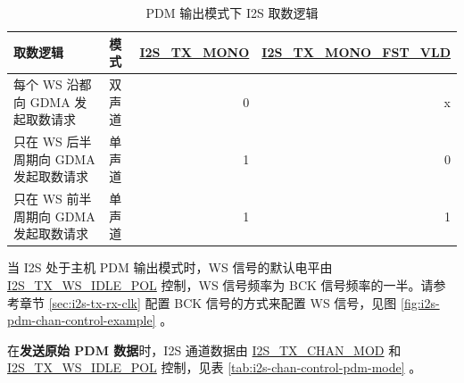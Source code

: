 \documentclass[main\_\_CN.tex]{subfiles}
\begin{document}
\begin{table}[H]
    \centering
    \caption{PDM 输出模式下 I2S 取数逻辑}
    \label{tab:i2s-data-fetch-control-pdm-mode}
    \begin{tabular}{|p{6.6cm}|l|r|r|}
    \hline
    \rowcolor{lightgray}
    \textbf{取数逻辑} &\textbf{模式} &\textbf{\hyperref[fielddesc:I2STXMONO]{I2S\_TX\_MONO}}  & \textbf{\hyperref[fielddesc:I2STXMONOFSTVLD]{I2S\_TX\_MONO\_FST\_VLD}} \\ \hline
                        每个 WS 沿都向 GDMA 发起取数请求 & 双声道 & 0 & x        \\ \hline
                        只在 WS 后半周期向 GDMA 发起取数请求  & 单声道 & 1 & 0   \\ \hline
                        只在 WS 前半周期向 GDMA 发起取数请求 & 单声道 & 1 & 1      \\ \hline
    \end{tabular}
\end{table}

当 I2S 处于主机 PDM 输出模式时，WS 信号的默认电平由 \hyperref[fielddesc:I2STXWSIDLEPOL]{I2S\_TX\_WS\_IDLE\_POL} 控制，WS 信号频率为 BCK 信号频率的一半。请参考章节 \ref{sec:i2s-tx-rx-clk} \textit{} 配置 BCK 信号的方式来配置 WS 信号，见图
\ref{fig:i2s-pdm-chan-control-example} \textit{}。

在\textbf{发送原始 PDM 数据}时，I2S 通道数据由 \hyperref[fielddesc:I2STXCHANMOD]{I2S\_TX\_CHAN\_MOD} 和 \hyperref[fielddesc:I2STXWSIDLEPOL]{I2S\_TX\_WS\_IDLE\_POL} 控制，见表 \ref{tab:i2s-chan-control-pdm-mode} \textit{}。
\end{document}
